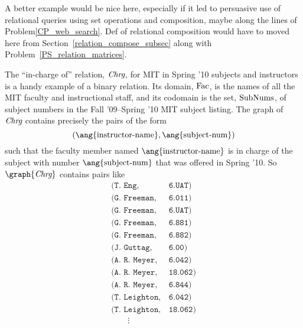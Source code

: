 \begin{editingnotes}
A better example would be nice here, especially if it led to
persuasive use of relational queries using set operations and
composition, maybe along the lines of Problem\ref{CP_web_search}.
Def of relational composition would have to moved here from
Section~\ref{relation_compose_subsec} along with
Problem~\ref{PS_relation_matrices}.
\end{editingnotes}

The ``in-charge of'' relation, $\textit{Chrg}$, for MIT in Spring '10 subjects
and instructors is a handy example of a binary relation.  Its domain,
$\text{Fac}$, is the names of all the MIT faculty and instructional staff,
and its codomain is the set, $\text{SubNums}$, of subject numbers in the
Fall '09--Spring '10 MIT subject listing.  The graph of $\textit{Chrg}$ contains
precisely the pairs of the form
\[
(\ang{\text{instructor-name}}, \ang{\text{subject-num}})
\]
such that the faculty member named $\ang{\text{instructor-name}}$ is in
charge of the subject with number $\ang{\text{subject-num}}$ that was
offered in Spring '10.  So $\graph{\inchrg}$ contains pairs like
\begin{equation}\label{incharge-pairs}
\begin{array}{ll}
  (\texttt{T. Eng},     & \texttt{6.UAT})\\
  (\texttt{G. Freeman}, & \texttt{6.011})\\
  (\texttt{G. Freeman}, & \texttt{6.UAT})\\
  (\texttt{G. Freeman}, & \texttt{6.881})\\
  (\texttt{G. Freeman}, & \texttt{6.882})\\
  (\texttt{J. Guttag},  & \texttt{6.00})\\
  (\texttt{A. R. Meyer}, & \texttt{6.042})\\
  (\texttt{A. R. Meyer}, & \texttt{18.062})\\
  (\texttt{A. R. Meyer}, & \texttt{6.844})\\
  (\texttt{T. Leighton}, & \texttt{6.042})\\
  (\texttt{T. Leighton}, & \texttt{18.062})\\
  \qquad \vdots
\end{array}
\end{equation}

\iffalse
This is a surprisingly complicated relation: Meyer is in charge of
subjects with three numbers.  Leighton is also in charge of subjects with
two of these three numbers---because the same subject, Mathematics for
Computer Science, has two numbers: 6.042 and 18.062, and Meyer and
Leighton are co-in-charge of the subject.  Freeman is in-charge of even
more subjects numbers (around 20), since as Department Education Officer,
he is in charge of whole blocks of special subject numbers.  Some
subjects, like 6.844 and 6.00 have only one person in-charge.  Some
faculty, like Guttag, are in charge of only one subject number, and no one
else is co-in-charge of his subject, 6.00.
\fi

